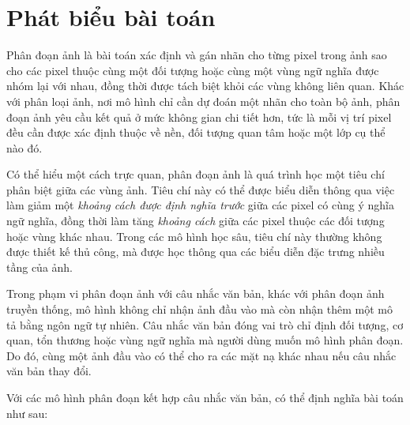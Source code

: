 \section{Phát biểu bài toán}
Phân đoạn ảnh là bài toán xác định và gán nhãn cho từng pixel trong ảnh sao cho các pixel thuộc cùng một đối tượng hoặc cùng một vùng ngữ nghĩa được nhóm lại với nhau, đồng thời được tách biệt khỏi các vùng không liên quan. Khác với phân loại ảnh, nơi mô hình chỉ cần dự đoán một nhãn cho toàn bộ ảnh, phân đoạn ảnh yêu cầu kết quả ở mức không gian chi tiết hơn, tức là mỗi vị trí pixel đều cần được xác định thuộc về nền, đối tượng quan tâm hoặc một lớp cụ thể nào đó.

Có thể hiểu một cách trực quan, phân đoạn ảnh là quá trình học một tiêu chí phân biệt giữa các vùng ảnh. Tiêu chí này có thể được biểu diễn thông qua việc làm giảm một \textit{khoảng cách được định nghĩa trước} giữa các pixel có cùng ý nghĩa ngữ nghĩa, đồng thời làm tăng \textit{khoảng cách} giữa các pixel thuộc các đối tượng hoặc vùng khác nhau. Trong các mô hình học sâu, tiêu chí này thường không được thiết kế thủ công, mà được học thông qua các biểu diễn đặc trưng nhiều tầng của ảnh.

Trong phạm vi phân đoạn ảnh với câu nhắc văn bản, khác với phân đoạn ảnh truyền thống, mô hình không chỉ nhận ảnh đầu vào mà còn nhận thêm một mô tả bằng ngôn ngữ tự nhiên. Câu nhắc văn bản đóng vai trò chỉ định đối tượng, cơ quan, tổn thương hoặc vùng ngữ nghĩa mà người dùng muốn mô hình phân đoạn. Do đó, cùng một ảnh đầu vào có thể cho ra các mặt nạ khác nhau nếu câu nhắc văn bản thay đổi.

Với các mô hình phân đoạn kết hợp câu nhắc văn bản, có thể định nghĩa bài toán như sau:

